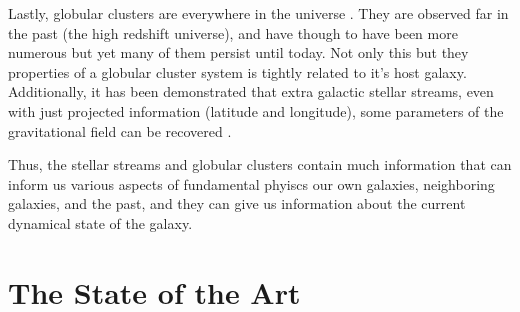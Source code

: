     Lastly, globular clusters are everywhere in the universe \citep{2006ARA&A..44..193B,2019ARA&A..57..227K}. They are observed far in the past (the high redshift universe), and have though to have been more numerous but yet many of them persist until today. Not only this but they properties of a globular cluster system is tightly related to it's host galaxy. Additionally, it has been demonstrated that extra galactic stellar streams, even with just projected information (latitude and longitude), some parameters of the gravitational field can be recovered \citep{2011MNRAS.417..198V, 2023ApJ...954..195N}. 

    Thus, the stellar streams and globular clusters contain much information that can inform us various aspects of fundamental phyiscs our own galaxies, neighboring galaxies, and the past, and they can give us information about the current dynamical state of the galaxy. 

\section{The State of the Art}